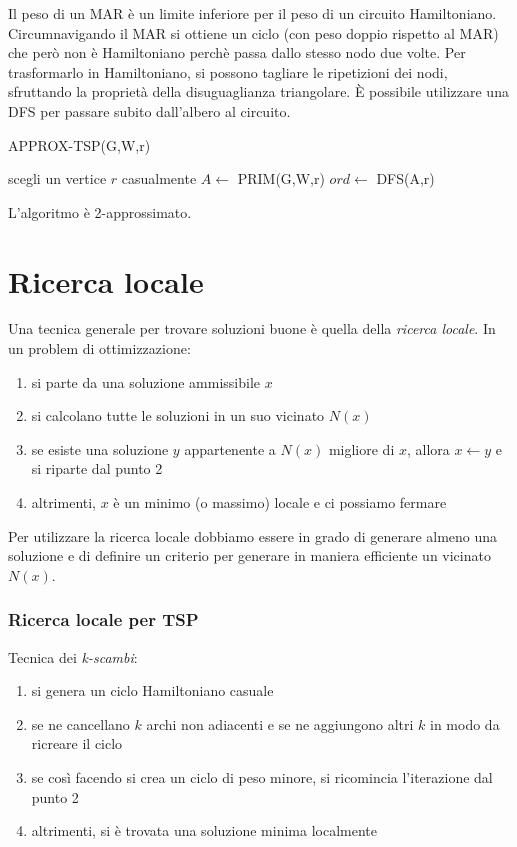 \documentclass[11pt]{book}
\begin{document}
Il peso di un MAR è un limite inferiore per il peso di un circuito Hamiltoniano. Circumnavigando il MAR si ottiene un ciclo 
(con peso doppio rispetto al MAR) che però non è Hamiltoniano perchè passa dallo stesso nodo due volte.
Per trasformarlo in Hamiltoniano, si possono tagliare le ripetizioni dei nodi, sfruttando la proprietà della disuguaglianza 
triangolare. È possibile utilizzare una DFS per passare subito dall'albero al circuito.
\begin{algorithm}
    \caption{APPROX-TSP(G,W,r)}
    \begin{algorithmic}
        \State scegli un vertice $r$ casualmente
        \State $A\gets$ PRIM(G,W,r)
        \State $ord\gets$ DFS(A,r)\\
    \end{algorithmic}
\end{algorithm}
L'algoritmo è 2-approssimato.
\section{Ricerca locale}
Una tecnica generale per trovare soluzioni buone è quella della \textit{ricerca locale}. In un problem di ottimizzazione: 
\begin{enumerate}
    \item si parte da una soluzione ammissibile $x$
    \item si calcolano tutte le soluzioni in un suo vicinato $N(x)$
    \item se esiste una soluzione $y$ appartenente a $N(x)$ migliore di $x$, allora $x\gets y$ e si riparte dal punto 2 
    \item altrimenti, $x$ è un minimo (o massimo) locale e ci possiamo fermare
\end{enumerate}
Per utilizzare la ricerca locale dobbiamo essere in grado di generare almeno una soluzione e di definire un criterio per 
generare in maniera efficiente un vicinato $N(x)$.
\subsubsection{Ricerca locale per TSP}
Tecnica dei \textit{k-scambi}:
\begin{enumerate}
    \item si genera un ciclo Hamiltoniano casuale 
    \item se ne cancellano $k$ archi non adiacenti e se ne aggiungono altri $k$ in modo da ricreare il ciclo 
    \item se così facendo si crea un ciclo di peso minore, si ricomincia l'iterazione dal punto 2 
    \item altrimenti, si è trovata una soluzione minima localmente 
\end{enumerate}
\end{document}
